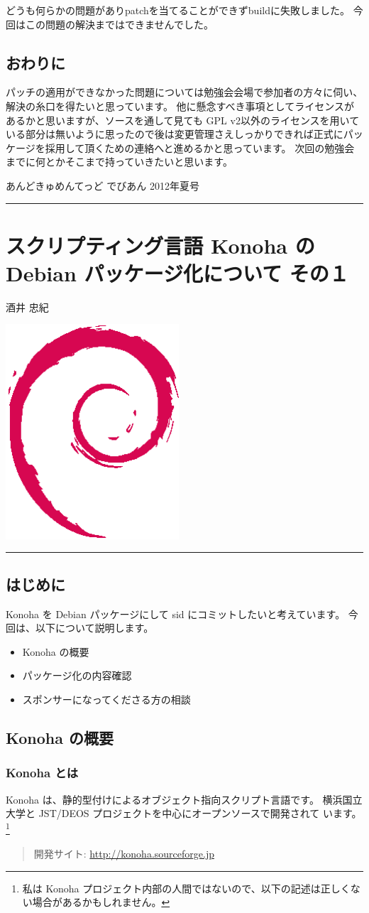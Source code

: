 \documentclass[mingoth,a4paper]{jsarticle}
\renewcommand{\dancersection}[2]{%
\newpage
あんどきゅめんてっど でびあん 2012年夏号
%
\vspace{0.1mm}\\
{\color{dancerdarkblue}\rule{\hsize}{2mm}}

%
%
\begin{minipage}[t]{0.6\hsize}
\color{dancerdarkblue}
\vspace{1cm}
\section{#1}
\hfill{}#2\\
\end{minipage}
\begin{minipage}[t]{0.4\hsize}
\vspace{-2cm}
\hfill{}\includegraphics[height=8cm]{image200502/openlogo-nd.eps}\\
\vspace{-5cm}
\end{minipage}
%
{\color{dancerlightblue}\rule{0.66\hsize}{2mm}}
%
\vspace{2cm}
}
\begin{document}
どうも何らかの問題がありpatchを当てることができずbuildに失敗しました。
今回はこの問題の解決まではできませんでした。

\subsection{おわりに}
パッチの適用ができなかった問題については勉強会会場で参加者の方々に伺い、解決の糸口を得たいと思っています。
他に懸念すべき事項としてライセンスがあるかと思いますが、ソースを通して見ても GPL v2以外のライセンスを用いている部分は無いように思ったので後は変更管理さえしっかりできれば正式にパッケージを採用して頂くための連絡へと進めるかと思っています。
次回の勉強会までに何とかそこまで持っていきたいと思います。

\clearpage

\dancersection{スクリプティング言語 Konoha の Debian パッケージ化について その１}{酒井 忠紀}

\subsection{はじめに}
Konoha を Debian パッケージにして sid にコミットしたいと考えています。
今回は、以下について説明します。
\begin{itemize}
\item Konoha の概要
\item パッケージ化の内容確認
\item スポンサーになってくださる方の相談
\end{itemize}

\subsection{Konoha の概要}

\subsubsection{Konoha とは}
Konoha は、静的型付けによるオブジェクト指向スクリプト言語です。
横浜国立大学と JST/DEOS プロジェクトを中心にオープンソースで開発されて
います。
\footnote{私は Konoha プロジェクト内部の人間ではないので、以下の記述は正しくない場合があるかもしれません。}

\begin{quote}
開発サイト: \url{http://konoha.sourceforge.jp}
\end{quote}
\end{document}
